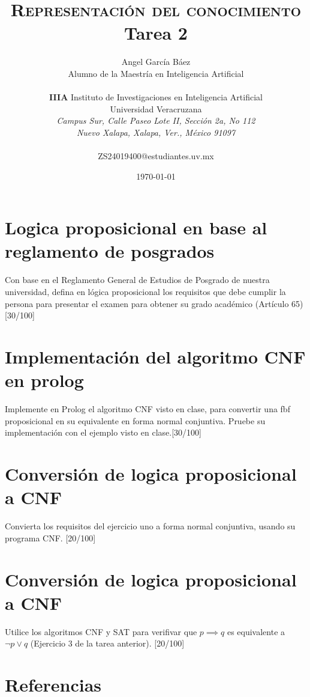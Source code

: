 \documentclass[11pt, letterpaper]{article}
\title{\textsc{Representación del conocimiento} \\
	Tarea 2
}
\author{Angel García Báez\\
	Alumno de la Maestría en Inteligencia Artificial \\ \\ \textbf{IIIA}
	Instituto de Investigaciones en Inteligencia Artificial \\
	Universidad Veracruzana \\ \emph{Campus Sur, Calle Paseo Lote II,
		Sección 2a, No 112} \\ \emph{Nuevo Xalapa, Xalapa, Ver., México 91097}
	\\ \\ ZS24019400@estudiantes.uv.mx}
\date{\today}
\begin{document}
	
	\maketitle

	\newpage
	
	\section{Logica proposicional en base al reglamento de posgrados}
	
	Con base en el Reglamento General de Estudios de Posgrado de nuestra
	universidad, defina en lógica proposicional los requisitos que debe cumplir la
	persona para presentar el examen para obtener su grado académico (Artículo
	65)[30/100] \\
	
	
	\newpage
	
	\section{Implementación del algoritmo CNF en prolog}
	
	Implemente en Prolog el algoritmo CNF visto en clase, para convertir una
	fbf proposicional en su equivalente en forma normal conjuntiva. Pruebe su
	implementación con el ejemplo visto en clase.[30/100]
		
	\newpage
	
	\section{Conversión de logica proposicional a CNF}
	
	Convierta los requisitos del ejercicio uno a forma normal conjuntiva, usando
	su programa CNF. [20/100] \\
	
	\newpage

	\section{Conversión de logica proposicional a CNF}

	Utilice los algoritmos CNF y SAT para verifivar que $p \implies q$ es equivalente a $\neg p \vee q$ (Ejercicio 3 de la tarea anterior). [20/100] \\


		
\newpage


\section{Referencias}  %


	
	
\end{document}
